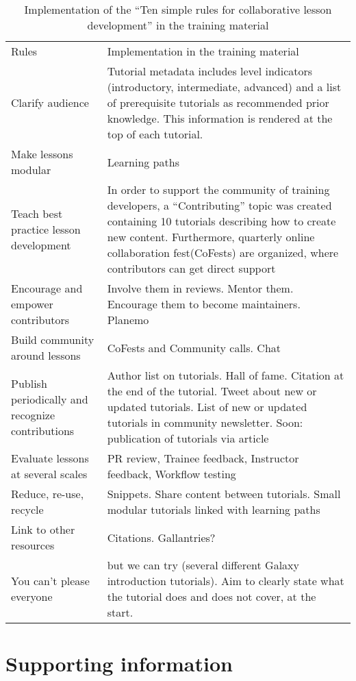 \documentclass[10pt,letterpaper]{article}
\begin{document}
\begin{table}[]
	\centering
	\caption{Implementation of the ``Ten simple rules for collaborative lesson development''\cite{Devenyi_2018} in the training material\label{tbl:tensimplerules}}
	\begin{tabular}{p{}p{}}
		Rules & Implementation in the training material \\
		Clarify audience & Tutorial metadata includes level indicators (introductory, intermediate, advanced) and a list of prerequisite tutorials as recommended prior knowledge. This information is rendered at the top of each tutorial. \\
		Make lessons modular & Learning paths \\
		Teach best practice lesson development & In order to support the community of training developers, a ``Contributing'' topic was created containing 10 tutorials describing how to create new content. Furthermore, quarterly online collaboration fest(CoFests) are organized, where contributors can get direct support  \\
		Encourage and empower contributors & Involve them in reviews. Mentor them. Encourage them to become maintainers. Planemo \\
		Build community around lessons & CoFests and Community calls. Chat \\
		Publish periodically and recognize contributions & Author list on tutorials. Hall of fame. Citation at the end of the tutorial. Tweet about new or updated tutorials. List of new or updated tutorials in community newsletter. Soon: publication of tutorials via article \\
		Evaluate lessons at several scales & PR review, Trainee feedback, Instructor feedback, Workflow testing \\
		Reduce, re-use, recycle & Snippets. Share content between tutorials. Small modular tutorials linked with learning paths \\
		Link to other resources & Citations. Gallantries? \\
		You can't please everyone & but we can try (several different Galaxy introduction tutorials). Aim to clearly state what the tutorial does and does not cover, at the start.  \\
	\end{tabular}
\end{table}






\section*{Supporting information}
\end{document}
